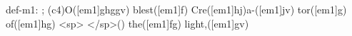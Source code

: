 def-m1: \grealign;
(c4)O([em1]ghggv) blest([em1]f) Cre([em1]hj)a-([em1]jv) tor([em1]g) of([em1]hg) <sp> </sp>() the([em1]fg) light,([em1]gv)